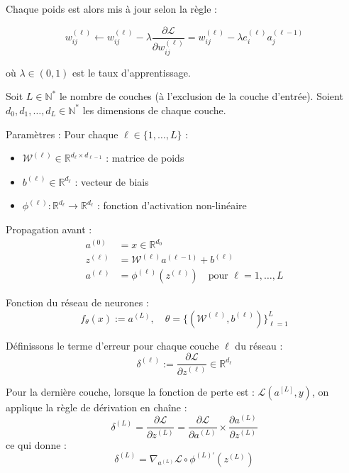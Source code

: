 Chaque poids est alors mis à jour selon la règle :

\begin{equation}
w_{ij}^{(\ell)} \leftarrow w_{ij}^{(\ell)} - \lambda \frac{\partial \mathcal{L}}{\partial w_{ij}^{(\ell)}} = w_{ij}^{(\ell)} - \lambda e_i^{(\ell)} a_j^{(\ell-1)}
\end{equation}

où \( \lambda \in (0,1) \) est le taux d'apprentissage.

\newpage

\begin{demonstration}
Soit $L \in \mathbb{N}^*$ le nombre de couches (à l'exclusion de la couche d'entrée).  
Soient $d_0, d_1, \dots, d_L \in \mathbb{N}^*$ les dimensions de chaque couche.

\medskip

Paramètres : Pour chaque $\ell \in \{1, \dots, L\}$ :
\begin{itemize}
    \item $\mathcal{W}^{(\ell)} \in \mathbb{R}^{d_\ell \times d_{\ell-1}}$ : matrice de poids
    \item $b^{(\ell)} \in \mathbb{R}^{d_\ell}$ : vecteur de biais
    \item $\phi^{(\ell)} : \mathbb{R}^{d_\ell} \to \mathbb{R}^{d_\ell}$ : fonction d’activation non-linéaire
\end{itemize}
\medskip

Propagation avant :
\[
\begin{aligned}
a^{(0)} &= x \in \mathbb{R}^{d_0} \\
z^{(\ell)} &= \mathcal{W}^{(\ell)} a^{(\ell-1)} + b^{(\ell)} \\
a^{(\ell)} &= \phi^{(\ell)}(z^{(\ell)}) \quad \text{pour } \ell = 1, \dots, L
\end{aligned}
\]

Fonction du réseau de neurones :
\[
f_\theta(x) := a^{(L)}, \quad \theta = \{ (\mathcal{W}^{(\ell)}, b^{(\ell)}) \}_{\ell=1}^{L}
\]

Définissons le terme d’erreur pour chaque couche $\ell$ du réseau :
\[
\delta^{(\ell)} := \frac{\partial \mathcal{L}}{\partial z^{(\ell)}} \in \mathbb{R}^{d_\ell}
\]

\medskip

Pour la dernière couche, lorsque la fonction de perte est : $\mathcal{L}(a^{[L]}, y)$, on applique la règle de dérivation en chaîne :
\[
\delta^{(L)} = \frac{\partial \mathcal{L}}{ \partial z^{(L)}} = \frac{\partial \mathcal{L}}{ \partial a^{(L)}} \times \frac{\partial a^{(L)}}{ \partial z^{(L)}}
\]
ce qui donne :
\[
\delta^{(L)} = \nabla_{a^{(L)}} \mathcal{L} \circ \phi^{(L)'}(z^{(L)})
\]


\end{demonstration}
